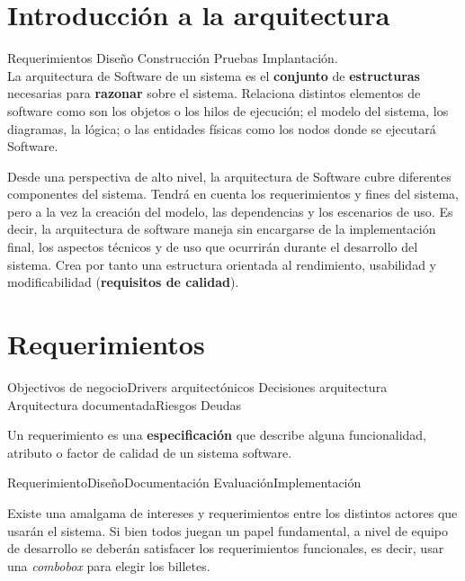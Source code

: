 
\section{Introducción a la arquitectura}
\label{sec:arquitectura:intro}

Requerimientos \textrightarrow Diseño \textrightarrow Construcción
\textrightarrow Pruebas \textrightarrow Implantación.
\\

La arquitectura de Software de un sistema es el \textbf{conjunto} de 
\textbf{estructuras} necesarias para \textbf{razonar} sobre el
sistema. Relaciona distintos elementos de software como son los
objetos o los hilos de ejecución; el modelo del sistema,
los diagramas, la lógica; o las entidades físicas como los nodos donde
se ejecutará Software.

Desde una perspectiva de alto nivel, la arquitectura de Software cubre
diferentes componentes del sistema. Tendrá en cuenta los
requerimientos y fines del sistema, pero a la vez la creación del
modelo, las dependencias y los escenarios de uso. Es decir, la
arquitectura de software maneja sin encargarse de la implementación
final, los aspectos técnicos y de uso que ocurrirán durante el
desarrollo del sistema. Crea por tanto una estructura orientada al
rendimiento, usabilidad y modificabilidad (\textbf{requisitos de calidad}).

\section{Requerimientos}
\label{sec:arquitectura:requerimientos}

Objectivos de negocio\textrightarrow Drivers arquitectónicos
\textrightarrow Decisiones arquitectura\textrightarrow\\ Arquitectura
documentada\textrightarrow Riesgos Deudas
\\\par
Un requerimiento es una \textbf{especificación} que describe alguna
funcionalidad, atributo o factor de calidad de un sistema software.
\\\par
Requerimiento\textrightarrow Diseño\textrightarrow Documentación
\textrightarrow Evaluación\textrightarrow Implementación

Existe una amalgama de intereses y requerimientos entre los distintos
actores que usarán el sistema. Si bien todos juegan un papel
fundamental, a nivel de equipo de desarrollo se deberán satisfacer los
requerimientos funcionales, es decir, usar una \emph{combobox} para
elegir los billetes.\cite[p.~14]{IS1ArquitecturaDia1}


